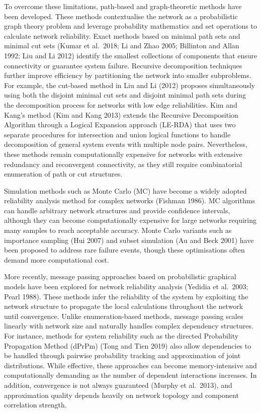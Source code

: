 \documentclass[preprint,12pt]{elsarticle}
\theoremstyle{definition}
\begin{document}
To overcome these limitations, path-based and graph-theoretic methods have been developed. These methods
contextualise the network as a probabilistic graph theory problem and leverage probability mathematics
and set operations to calculate network reliability. Exact methods based on minimal path sets and minimal
cut sets (Kumar et al.\ 2018; Li and Zhao 2005; Billinton and Allan 1992; Liu and Li 2012) identify the
smallest collections of components that ensure connectivity or guarantee system failure. Recursive
decomposition techniques further improve efficiency by partitioning the network into smaller subproblems.
For example, the cut-based method in Liu and Li (2012) proposes simultaneously using both the disjoint
minimal cut sets and disjoint minimal path sets during the decomposition process for networks with low
edge reliabilities. Kim and Kang's method (Kim and Kang 2013) extends the Recursive Decomposition
Algorithm through a Logical Expansion approach (LE-RDA) that uses two separate procedures for
intersection and union logical functions to handle decomposition of general system events with multiple
node pairs. Nevertheless, these methods remain computationally expensive for networks with extensive
redundancy and reconvergent connectivity, as they still require combinatorial enumeration of path or cut
structures.

Simulation methods such as Monte Carlo (MC) have become a widely adopted reliability analysis method for
complex networks (Fishman 1986). MC algorithms can handle arbitrary network structures and provide
confidence intervals, although they can become computationally expensive for large networks requiring
many samples to reach acceptable accuracy. Monte Carlo variants such as importance sampling (Hui 2007)
and subset simulation (Au and Beck 2001) have been proposed to address rare failure events, though these
optimisations often demand more computational cost.

More recently, message passing approaches based on probabilistic graphical models have been explored for
network reliability analysis (Yedidia et al.\ 2003; Pearl 1988). These methods infer the reliability of
the system by exploiting the network structure to propagate the local calculations throughout the network
until convergence. Unlike enumeration-based methods, message passing scales linearly with network size
and naturally handles complex dependency structures. For instance, methods for system reliability such as
the directed Probability Propagation Method (dPrPm) (Tong and Tien 2019) also allow dependencies to be
handled through pairwise probability tracking and approximation of joint distributions. While effective,
these approaches can become memory-intensive and computationally demanding as the number of dependent
interactions increases. In addition, convergence is not always guaranteed (Murphy et al.\ 2013), and
approximation quality depends heavily on network topology and component correlation strength.
\end{document}
